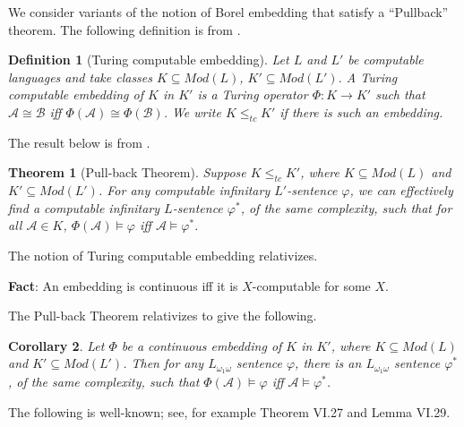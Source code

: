 \documentclass{article}
\newtheorem{thm}{Theorem}[section]
\newtheorem{cor}[thm]{Corollary}
\newtheorem{defn}{Definition}
\begin{document}
We consider variants of the notion of Borel embedding that satisfy a ``Pullback'' theorem.  
The following definition is from \cite{CCKM}.

\begin{defn} [Turing computable embedding]

Let $L$ and $L'$ be computable languages and take classes $K\subseteq Mod(L)$, $K'\subseteq Mod(L')$.   A \emph{Turing computable embedding} of $K$ in $K'$ is a Turing operator $\Phi:K\rightarrow K'$ such that $\mathcal{A}\cong\mathcal{B}$ iff $\Phi(\mathcal{A})\cong\Phi(\mathcal{B})$.  We write $K\leq_{tc} K'$ if there is such an embedding.  

\end{defn}

The result below is from \cite{KMV}. 

\begin{thm} [Pull-back Theorem]

Suppose $K\leq_{tc} K'$, where $K\subseteq Mod(L)$ and $K'\subseteq Mod(L')$.  For any computable infinitary $L'$-sentence  $\varphi$, we can effectively find a computable infinitary $L$-sentence $\varphi^*$, of the same complexity, such that for all $\mathcal{A}\in K$, $\Phi(\mathcal{A})\models \varphi$ iff $\mathcal{A}\models\varphi^*$.  

\end{thm}

The notion of Turing computable embedding relativizes.  

\bigskip
\noindent
\textbf{Fact}:  An embedding is continuous iff it is $X$-computable for some $X$.  

\bigskip

The Pull-back Theorem relativizes to give the following.     

\begin{cor}

Let $\Phi$ be a continuous embedding of $K$ in $K'$, where $K\subseteq Mod(L)$ and $K'\subseteq Mod(L')$.  Then for any $L_{\omega_1\omega}$ sentence $\varphi$, there is an $L_{\omega_1\omega}$ sentence $\varphi^*$, of the same complexity, such that $\Phi(\mathcal{A})\models\varphi$ iff $\mathcal{A}\models\varphi^*$.  

\end{cor}

The following is well-known; see, for example \cite{Mbook1} Theorem VI.27 and Lemma VI.29.
\end{document}
